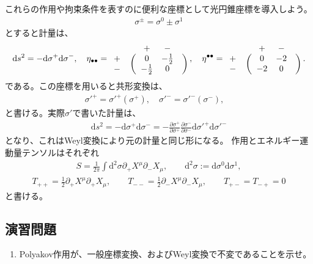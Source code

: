 \documentclass[report,paper=a4, fontsize=12pt, line_length=16cm, number_of_lines=33,dvipdfmx]{jlreq}
\numberwithin{equation}{chapter}
\numberwithin{equation}{section}
\newcommand{\del}{\partial}
\newcommand{\di}{\mathrm{d}}
\begin{document}
これらの作用や拘束条件を表すのに便利な座標として光円錐座標を導入しよう。
\begin{align}
\sigma^{\pm}=\sigma^{0}\pm\sigma^{1}
\end{align}
とすると計量は、
\begin{align}
\di s^2=-\di \sigma^{+}\di \sigma^{-},\quad
\eta_{\bullet\bullet}=
\begin{array}{crccl}
      && + & - & \\
 + &\ldelim({2}{4pt}[] &0     & -\frac12 &\rdelim){2}{4pt}[]          \\
 - &  &-\frac12      & 0  &
\end{array}
,\quad
\eta^{\bullet\bullet}=
\begin{array}{crccl}
      && + & - & \\
 + &\ldelim({2}{4pt}[] &0     & -2 &\rdelim){2}{4pt}[]          \\
 - &  &-2      & 0  &
\end{array}.
\end{align}
である。この座標を用いると共形変換は、
\begin{align}
\sigma'^{+}=\sigma'^{+}(\sigma^{+}),\quad
\sigma'^{-}=\sigma'^{-}(\sigma^{-}),\quad
\end{align}
と書ける。実際$\sigma'$で書いた計量は、
\begin{align}
\di s^2=-\di \sigma^{+}\di \sigma^{-}
=-
\frac{\del \sigma^{+}}{\del \sigma^{+}}
\frac{\del \sigma^{-}}{\del \sigma^{-}}
\di \sigma'^{+}\di \sigma'^{-}
\end{align}
となり、これはWeyl変換により元の計量と同じ形になる。
作用とエネルギー運動量テンソルはそれぞれ
\begin{align}
S=\frac{1}{2\pi}\int \di^2\sigma \del_{+}X^{\mu}\del_{-}X_{\mu},\qquad \di^2\sigma:=\di\sigma^0 \di\sigma^1,
\label{fixed-action}
\end{align}
\begin{align}
T_{++}=\frac12 \del_{+}X^{\mu}\del_{+}X_{\mu},\qquad
T_{--}=\frac12 \del_{-}X^{\mu}\del_{-}X_{\mu},\qquad
T_{+-}=T_{-+}=0
\label{fixed-em}
\end{align}
と書ける。
\subsection*{演習問題}
\begin{enumerate}
\item Polyakov作用が、一般座標変換、およびWeyl変換で不変であることを示せ。
\end{enumerate}
\end{document}

